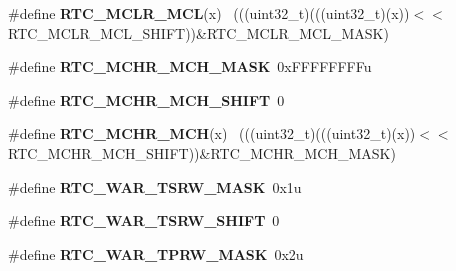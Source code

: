\begin{DoxyCompactItemize}
\item 
\hypertarget{group___r_t_c___register___masks_ga90f8a1e375bbba5540c8f6558a825d1d}{}\#define {\bfseries R\+T\+C\+\_\+\+M\+C\+L\+R\+\_\+\+M\+C\+L}(x)                                                ~(((uint32\+\_\+t)(((uint32\+\_\+t)(x))$<$$<$R\+T\+C\+\_\+\+M\+C\+L\+R\+\_\+\+M\+C\+L\+\_\+\+S\+H\+I\+F\+T))\&R\+T\+C\+\_\+\+M\+C\+L\+R\+\_\+\+M\+C\+L\+\_\+\+M\+A\+S\+K)\label{group___r_t_c___register___masks_ga90f8a1e375bbba5540c8f6558a825d1d}

\item 
\hypertarget{group___r_t_c___register___masks_ga61bff04fad386ecf2c586c139558532c}{}\#define {\bfseries R\+T\+C\+\_\+\+M\+C\+H\+R\+\_\+\+M\+C\+H\+\_\+\+M\+A\+S\+K}~0x\+F\+F\+F\+F\+F\+F\+F\+Fu\label{group___r_t_c___register___masks_ga61bff04fad386ecf2c586c139558532c}

\item 
\hypertarget{group___r_t_c___register___masks_gaceeb14ef568041861c097acddaeabd96}{}\#define {\bfseries R\+T\+C\+\_\+\+M\+C\+H\+R\+\_\+\+M\+C\+H\+\_\+\+S\+H\+I\+F\+T}~0\label{group___r_t_c___register___masks_gaceeb14ef568041861c097acddaeabd96}

\item 
\hypertarget{group___r_t_c___register___masks_ga6e53d8b6120dcaf887a39a8aa7078c89}{}\#define {\bfseries R\+T\+C\+\_\+\+M\+C\+H\+R\+\_\+\+M\+C\+H}(x)                                                ~(((uint32\+\_\+t)(((uint32\+\_\+t)(x))$<$$<$R\+T\+C\+\_\+\+M\+C\+H\+R\+\_\+\+M\+C\+H\+\_\+\+S\+H\+I\+F\+T))\&R\+T\+C\+\_\+\+M\+C\+H\+R\+\_\+\+M\+C\+H\+\_\+\+M\+A\+S\+K)\label{group___r_t_c___register___masks_ga6e53d8b6120dcaf887a39a8aa7078c89}

\item 
\hypertarget{group___r_t_c___register___masks_ga4a43de9885f5d7ec5888d140315f1c15}{}\#define {\bfseries R\+T\+C\+\_\+\+W\+A\+R\+\_\+\+T\+S\+R\+W\+\_\+\+M\+A\+S\+K}~0x1u\label{group___r_t_c___register___masks_ga4a43de9885f5d7ec5888d140315f1c15}

\item 
\hypertarget{group___r_t_c___register___masks_gabf5ee77e5695cd42b86430a86ae7208e}{}\#define {\bfseries R\+T\+C\+\_\+\+W\+A\+R\+\_\+\+T\+S\+R\+W\+\_\+\+S\+H\+I\+F\+T}~0\label{group___r_t_c___register___masks_gabf5ee77e5695cd42b86430a86ae7208e}

\item 
\hypertarget{group___r_t_c___register___masks_gae9b8d07cbb9d8d13e57c8428a6379a6d}{}\#define {\bfseries R\+T\+C\+\_\+\+W\+A\+R\+\_\+\+T\+P\+R\+W\+\_\+\+M\+A\+S\+K}~0x2u\label{group___r_t_c___register___masks_gae9b8d07cbb9d8d13e57c8428a6379a6d}


\end{DoxyCompactItemize}
